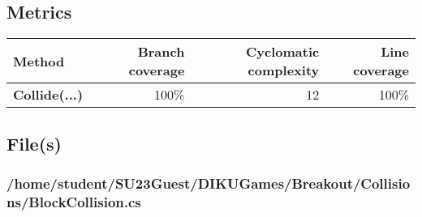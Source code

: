 \documentclass[a4paper,landscape,10pt]{article}
\begin{document}
\subsection{Metrics}
\begin{longtable}[l]{|l|r|r|r|}
\hline
\textbf{Method} & \textbf{Branch coverage} & \textbf{Cyclomatic complexity} & \textbf{Line coverage}\\
\hline
\textbf{Collide(...)} & 100\% & 12 & 100\%\\
\hline
\end{longtable}
\subsection{File(s)}
\subsubsection{/home/student/SU23Guest/DIKUGames/Breakout/Collisions/BlockCollision.cs}
\end{document}
